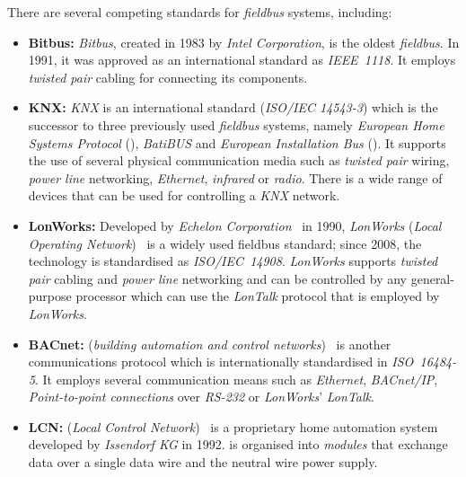 There are several competing standards for \emph{fieldbus} systems, including:
\begin{itemize}
  \item \textbf{Bitbus:} \emph{Bitbus}, created in 1983 by \emph{Intel Corporation}, is the oldest \emph{fieldbus}. In 1991, it was approved as an international standard as \emph{IEEE~1118}\cite{IEEE1118}. It employs \emph{twisted pair} cabling for connecting its components.
  
  \item \textbf{KNX:} \emph{KNX} is an international standard (\emph{ISO/IEC 14543-3}\cite{knx,knx_standard}) which is the successor to three previously used \emph{fieldbus} systems, namely \emph{European Home Systems Protocol} (), \emph{BatiBUS} and \emph{European Installation Bus} (). It supports the use of several physical communication media such as \emph{twisted pair} wiring, \emph{power line} networking, \emph{Ethernet}, \emph{infrared} or \emph{radio}. There is a wide range of devices that can be used for controlling a \emph{KNX} network.
  
  \item \textbf{LonWorks:} Developed by \emph{Echelon Corporation}~\cite{echelon} in 1990, \emph{LonWorks} (\emph{Local Operating Network})~\cite{lonworks} is a widely used fieldbus standard; since 2008, the technology is standardised as \emph{ISO/IEC~14908}\cite{ISO14908}. \emph{LonWorks} supports \emph{twisted pair} cabling and \emph{power line} networking and can be controlled by any general-purpose processor which can use the \emph{LonTalk} protocol that is employed by \emph{LonWorks}.
  
  \item \textbf{BACnet:}  (\emph{building automation and control networks})~\cite{bacnet} is another communications protocol which is internationally standardised in \emph{ISO~16484-5}\cite{ISO16484}. It employs several communication means such as \emph{Ethernet}, \emph{BACnet/IP}, \emph{Point-to-point connections} over \emph{RS-232} or \emph{LonWorks}' \emph{LonTalk}.
  
  \item \textbf{LCN:}  (\emph{Local Control Network})~\cite{LCN} is a proprietary home automation system developed by \emph{Issendorf KG} in 1992.  is organised into \emph{ modules} that exchange data over a single data wire and the neutral wire power supply.
\end{itemize}

